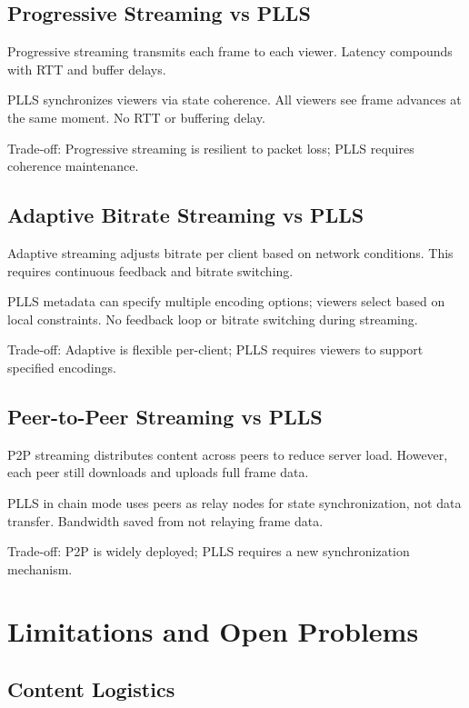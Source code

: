 \documentclass[twocolumn,10pt,a4paper]{article}
\theoremstyle{plain}
\theoremstyle{definition}
\begin{document}
\subsection{Progressive Streaming vs PLLS}

Progressive streaming transmits each frame to each viewer. Latency compounds with RTT and buffer delays.

PLLS synchronizes viewers via state coherence. All viewers see frame advances at the same moment. No RTT or buffering delay.

Trade-off: Progressive streaming is resilient to packet loss; PLLS requires coherence maintenance.

\subsection{Adaptive Bitrate Streaming vs PLLS}

Adaptive streaming adjusts bitrate per client based on network conditions. This requires continuous feedback and bitrate switching.

PLLS metadata can specify multiple encoding options; viewers select based on local constraints. No feedback loop or bitrate switching during streaming.

Trade-off: Adaptive is flexible per-client; PLLS requires viewers to support specified encodings.

\subsection{Peer-to-Peer Streaming vs PLLS}

P2P streaming distributes content across peers to reduce server load. However, each peer still downloads and uploads full frame data.

PLLS in chain mode uses peers as relay nodes for state synchronization, not data transfer. Bandwidth saved from not relaying frame data.

Trade-off: P2P is widely deployed; PLLS requires a new synchronization mechanism.

\section{Limitations and Open Problems}
\label{sec:open}

\subsection{Content Logistics}
\end{document}
